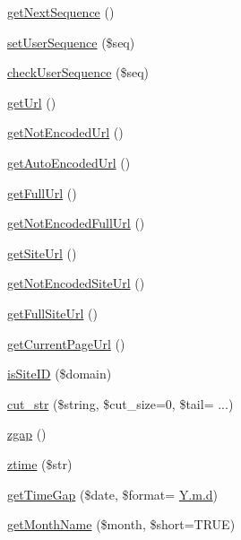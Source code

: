 \begin{DoxyCompactItemize}
\item 
\hyperlink{func_8inc_8php_a5a97b458f9c5b4fe3574671840aee27c}{get\+Next\+Sequence} ()
\item 
\hyperlink{func_8inc_8php_aa3832c4893dae39987cf056c24c29392}{set\+User\+Sequence} (\$seq)
\item 
\hyperlink{func_8inc_8php_a56536fb66de4e320aaac07b82e6c2e21}{check\+User\+Sequence} (\$seq)
\item 
\hyperlink{func_8inc_8php_accd14bda49a1044b4d8dd93f020f11ee}{get\+Url} ()
\item 
\hyperlink{func_8inc_8php_aa73dbeb07c5bcac26c24fe4c6b05d8d2}{get\+Not\+Encoded\+Url} ()
\item 
\hyperlink{func_8inc_8php_a77e631a54eea5ecea3a77feb56129104}{get\+Auto\+Encoded\+Url} ()
\item 
\hyperlink{func_8inc_8php_acaf8f155dd27e065b7fb0f5c3f702027}{get\+Full\+Url} ()
\item 
\hyperlink{func_8inc_8php_a06116450c538bd1f67cf3209bfd16610}{get\+Not\+Encoded\+Full\+Url} ()
\item 
\hyperlink{func_8inc_8php_a2d80ea9652d1586d5dcd03d022150f73}{get\+Site\+Url} ()
\item 
\hyperlink{func_8inc_8php_aa09cef59156d4afaeee54a675605f95d}{get\+Not\+Encoded\+Site\+Url} ()
\item 
\hyperlink{func_8inc_8php_a778b55fa9ebcf9a5ef0b017b998d9894}{get\+Full\+Site\+Url} ()
\item 
\hyperlink{func_8inc_8php_ae9a94dea2a8e11ebf9010683a124fabf}{get\+Current\+Page\+Url} ()
\item 
\hyperlink{func_8inc_8php_aa85a46b82e60cc2c64682ea6464eeeff}{is\+Site\+ID} (\$domain)
\item 
\hyperlink{func_8inc_8php_ad7b240a38cc63f3a576d4b7c391fda16}{cut\+\_\+str} (\$string, \$cut\+\_\+size=0, \$tail= \textquotesingle{}...\textquotesingle{})
\item 
\hyperlink{func_8inc_8php_acac2e71b99c40a4736c3ba62c0b8ac70}{zgap} ()
\item 
\hyperlink{func_8inc_8php_afa835b7d80cf54db78fd0cb7d81c7968}{ztime} (\$str)
\item 
\hyperlink{func_8inc_8php_a8c68983e66e199e8b7f1b5dad8f0c3ab}{get\+Time\+Gap} (\$date, \$format= \textquotesingle{}\hyperlink{xpresseditor_8min_8js_aa27188e30a5d2270a230edf44af69623}{Y.\+m.\+d}\textquotesingle{})
\item 
\hyperlink{func_8inc_8php_adc2ced210718f27abac98392564a7b82}{get\+Month\+Name} (\$month, \$short=T\+R\+UE)
\item 

\end{DoxyCompactItemize}
